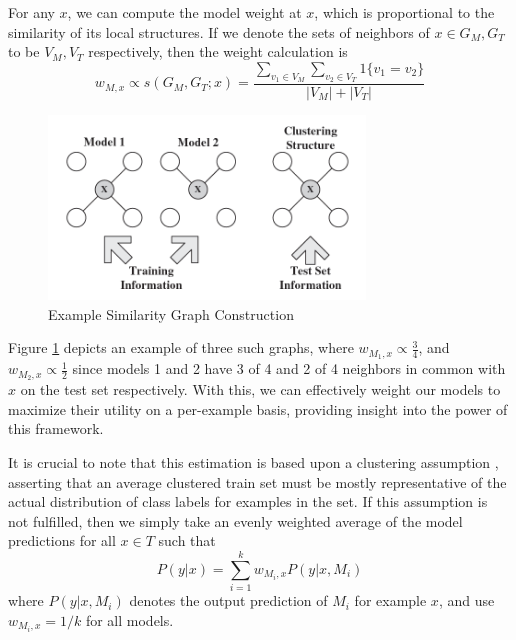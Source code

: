 \documentclass[12pt]{article}
\begin{document}
    For any $x$, we can compute the model weight at $x$, which is proportional to the similarity of its local structures. If we denote the sets of neighbors of $x \in G_M, G_T$ to be $V_M, V_T$ respectively, then the weight calculation \autocite{gao_fan_jiang_han_2008} is
    \begin{equation} \label{structural-similarity}
      w_{M,x} \propto s(G_M, G_T;x) = \frac{\sum_{v_1 \in V_M} \sum_{v_2 \in V_T} 1\{v_1 = v_2\}}{|V_M| + |V_T|}
    \end{equation}

    \begin{figure}[h]
      \centering
      \includegraphics[width=0.75\textwidth]{similarity-approx.png}
      \caption{Example Similarity Graph Construction}
      \label{graph-construction-fig}
    \end{figure}

    Figure \ref{graph-construction-fig} depicts an example of three such graphs, where $w_{M_1,x} \propto \frac34$, and $w_{M_2,x} \propto \frac12$ since models 1 and 2 have 3 of 4 and 2 of 4 neighbors in common with $x$ on the test set respectively. With this, we can effectively weight our models to maximize their utility on a per-example basis, providing insight into the power of this framework.

    It is crucial to note that this estimation is based upon a clustering assumption \autocite{gao_fan_jiang_han_2008}, asserting that an average clustered train set must be mostly representative of the actual distribution of class labels for examples in the set. If this assumption is not fulfilled, then we simply take an evenly weighted average of the model predictions for all $x \in T$ such that
    \begin{equation} \label{weighted-model-output}
      P(y|x) = \sum_{i=1}^{k}w_{M_i, x}P(y|x, M_i)
    \end{equation}
    where $P(y|x, M_i)$ denotes the output prediction of $M_i$ for example $x$, and use $w_{M_i, x} = 1/k$ for all models.
\end{document}
